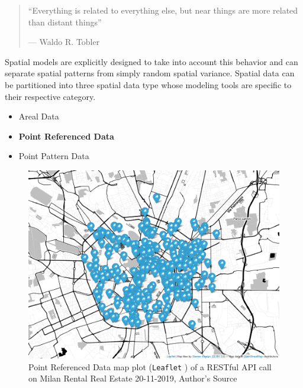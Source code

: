 \documentclass[
  12pt,
  a4paper,
  oneside]{book}
\newcommand{\passthrough}[1]{#1}
\providecommand{\tightlist}{%
  \setlength{\itemsep}{0pt}\setlength{\parskip}{0pt}}
\theoremstyle{definition}
\theoremstyle{definition}
\theoremstyle{definition}
\theoremstyle{remark}
\begin{document}
\begin{quote}
``Everything is related to everything else,
but near things are more related than distant things''

\hfill --- Waldo R. Tobler
\end{quote}

Spatial models are explicitly designed to take into account this behavior and can separate spatial patterns from simply random spatial variance.
Spatial data can be partitioned into three spatial data type whose modeling tools are specific to their respective category.

\begin{itemize}
\tightlist
\item
  Areal Data
\item
  \textbf{Point Referenced Data}
\item
  Point Pattern Data
\end{itemize}

\begin{figure}
\centering
\includegraphics{images/map.png}
\caption{\label{fig:prdmap}Point Referenced Data map plot (\passthrough{\lstinline!Leaflet!} \citet{leaflet}) of a RESTful API call on Milan Rental Real Estate 20-11-2019, Author's Source}
\end{figure}
\end{document}
